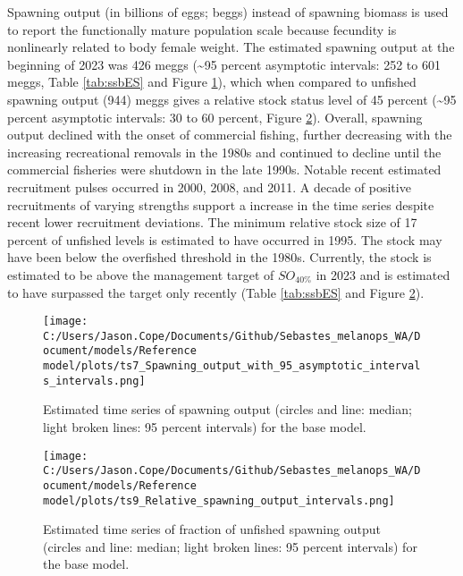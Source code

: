 \documentclass[11pt,
  letterpaper,
]{article}
\begin{document}
Spawning output (in billions of eggs; beggs) instead of spawning biomass is used to report the functionally mature population scale because fecundity is nonlinearly related to body female weight. The estimated spawning output at the beginning of 2023 was 426 meggs (\textasciitilde95 percent asymptotic intervals: 252 to 601 meggs, Table \ref{tab:ssbES} and Figure \ref{fig:es-ssb}), which when compared to unfished spawning output (944) meggs gives a relative stock status level of 45 percent (\textasciitilde95 percent asymptotic intervals: 30 to 60 percent, Figure \ref{fig:es-depl}). Overall, spawning output declined with the onset of commercial fishing, further decreasing with the increasing recreational removals in the 1980s and continued to decline until the commercial fisheries were shutdown in the late 1990s. Notable recent estimated recruitment pulses occurred in 2000, 2008, and 2011. A decade of positive recruitments of varying strengths support a increase in the time series despite recent lower recruitment deviations. The minimum relative stock size of 17 percent of unfished levels is estimated to have occurred in 1995. The stock may have been below the overfished threshold in the 1980s. Currently, the stock is estimated to be above the management target of \(SO_{40\%}\) in 2023 and is estimated to have surpassed the target only recently (Table \ref{tab:ssbES} and Figure \ref{fig:es-depl}).



\begin{figure}
{\centering
\texttt{[image: C:/Users/Jason.Cope/Documents/Github/Sebastes\_melanops\_WA/Document/models/Reference model/plots/ts7\_Spawning\_output\_with\_95\_asymptotic\_intervals\_intervals.png]}
}
\caption{Estimated time series of spawning output (circles and line: median; light broken lines: 95 percent intervals) for the base model.\label{fig:es-ssb}}
\end{figure}

\begin{figure}
{\centering
\texttt{[image: C:/Users/Jason.Cope/Documents/Github/Sebastes\_melanops\_WA/Document/models/Reference model/plots/ts9\_Relative\_spawning\_output\_intervals.png]}
}
\caption{Estimated time series of fraction of unfished spawning output (circles and line: median; light broken lines: 95 percent intervals) for the base model.\label{fig:es-depl}}
\end{figure}
\end{document}
